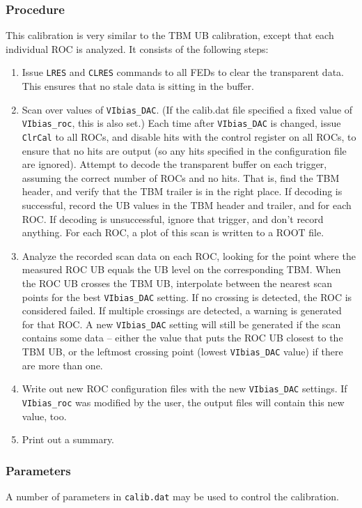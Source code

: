 \subsubsection{Procedure}

This calibration is very similar to the TBM UB calibration, except that each individual ROC is analyzed.  It consists of the following steps:

\begin{enumerate}
\item Issue \verb|LRES| and \verb|CLRES| commands to all FEDs to clear the transparent data.  This ensures that no stale data is sitting in the buffer.
\item Scan over values of \verb|VIbias_DAC|.  (If the calib.dat file specified a fixed value of \verb|VIbias_roc|, this is also set.)  Each time after \verb|VIbias_DAC| is changed, issue \verb|ClrCal| to all ROCs, and disable hits with the control register on all ROCs, to ensure that no hits are output (so any hits specified in the configuration file are ignored).  Attempt to decode the transparent buffer on each trigger, assuming the correct number of ROCs and no hits.  That is, find the TBM header, and verify that the TBM trailer is in the right place.  If decoding is successful, record the UB values in the TBM header and trailer, and for each ROC.  If decoding is unsuccessful, ignore that trigger, and don't record anything.  For each ROC, a plot of this scan is written to a ROOT file.
\item Analyze the recorded scan data on each ROC, looking for the point where the measured ROC UB equals the UB level on the corresponding TBM. When the ROC UB crosses the TBM UB, interpolate between the nearest scan points for the best \verb|VIbias_DAC| setting. If no crossing is detected, the ROC is considered failed.  If multiple crossings are detected, a warning is generated for that ROC.  A new \verb|VIbias_DAC| setting will still be generated if the scan contains some data -- either the value that puts the ROC UB closest to the TBM UB, or the leftmost crossing point (lowest \verb|VIbias_DAC| value) if there are more than one.
\item Write out new ROC configuration files with the new \verb|VIbias_DAC| settings.  If \verb|VIbias_roc| was modified by the user, the output files will contain this new value, too.
\item Print out a summary.
\end{enumerate}

\subsubsection{Parameters}
A number of parameters in \verb|calib.dat| may be used to control the calibration.

